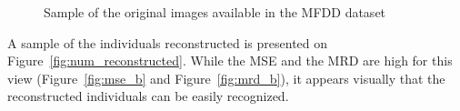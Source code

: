 \begin{figure}[H]
    \caption{Sample of the original images available in the MFDD dataset}
\label{fig:num_original}
\end{figure}

A sample of the individuals reconstructed is presented on Figure~\ref{fig:num_reconstructed}. While the MSE and the MRD are high for this view (Figure~\ref{fig:mse_b} and Figure~\ref{fig:mrd_b}), it appears visually that the reconstructed individuals can be easily recognized.

